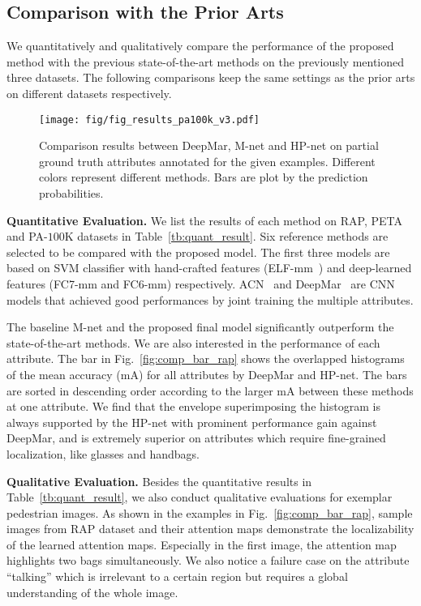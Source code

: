 \documentclass[10pt,twocolumn,letterpaper]{article}
\begin{document}
\subsection{Comparison with the Prior Arts}
\label{subsec:attribute_comp_results}

We quantitatively and qualitatively compare the performance of the proposed method with the previous state-of-the-art methods on the previously mentioned three datasets.
The following comparisons keep the same settings as the prior arts on different datasets respectively.





\begin{figure}[t]
\centering
\texttt{[image: fig/fig\_results\_pa100k\_v3.pdf]}
\caption{
Comparison results between DeepMar, M-net and HP-net on partial ground truth attributes annotated for the given examples. Different colors represent different methods. Bars are plot by the prediction probabilities.
}
\label{fig:result_pa100k}
\vspace{-0.2cm}
\end{figure}



\noindent\textbf{Quantitative Evaluation.}
We list the results of each method on RAP, PETA and PA-$100$K datasets in Table~\ref{tb:quant_result}.
Six reference methods are selected to be compared with the proposed model.
The first three models are based on SVM classifier with hand-crafted features (ELF-mm~\cite{gray2008viewpoint,prosser2010person}) and deep-learned features (FC7-mm and FC6-mm) respectively.
ACN~\cite{sudowe2015person} and DeepMar~\cite{li2015multi} are CNN models that achieved good performances by joint training the multiple attributes.

The baseline M-net and the proposed final model significantly outperform the state-of-the-art methods.
We are also interested in the performance of each attribute.
The bar in Fig.~\ref{fig:comp_bar_rap} shows the overlapped histograms of the mean accuracy (mA) for all attributes by DeepMar and HP-net.
The bars are sorted in descending order according to the larger mA between these methods at one attribute.
We find that the envelope superimposing the histogram is always supported by the HP-net with prominent performance gain against DeepMar, and is extremely superior on attributes which require fine-grained localization, like glasses and handbags.

\noindent\textbf{Qualitative Evaluation.}
Besides the quantitative results in Table~\ref{tb:quant_result}, we also conduct qualitative evaluations for exemplar pedestrian images.
As shown in the examples in Fig.~\ref{fig:comp_bar_rap}, sample images from RAP dataset and their attention maps demonstrate the localizability of the learned attention maps.
Especially in the first image, the attention map highlights two bags simultaneously.
We also notice a failure case on the attribute ``talking'' which is irrelevant to a certain region but requires a global understanding of the whole image.
\end{document}
